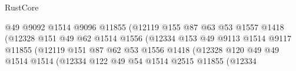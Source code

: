 \begin{lexlean}{RustCore}
\begin{coremodule}
                                              @49
                                              @9092
                                              @1514
                                              @9096
                                              @11855
                                              (@12119
                                                @155
                                                @87
                                                @63
                                                @53
                                                @1557
                                                @1418
                                                (@12328
                                                  @151
                                                  @49
                                                  @62
                                                  @1514
                                                  @1556
                                                  (@12334
                                                    @153
                                                    @49
                                                    @9113
                                                    @1514
                                                    @9117
                                                    @11855
                                                    (@12119
                                                      @151
                                                      @87
                                                      @62
                                                      @53
                                                      @1556
                                                      @1418
                                                      (@12328
                                                        @120
                                                        @49
                                                        @49
                                                        @1514
                                                        @1514
                                                        (@12334
                                                          @122
                                                          @49
                                                          @54
                                                          @1514
                                                          @2515
                                                          @11855
                                                          (@12334

\end{coremodule}
\end{lexlean}
